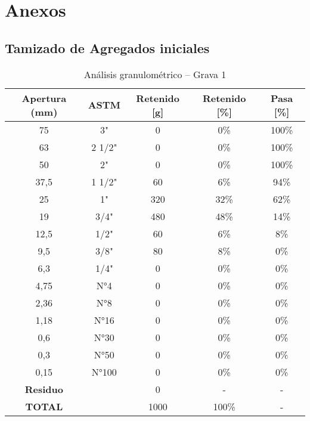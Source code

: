 \section{Anexos}

\subsection{Tamizado de Agregados iniciales}

\begin{table}[H]
\centering
\caption{Análisis granulométrico – Grava 1}
\label{tab:grava1}
\small
\begin{tabular}{|c|c|c|c|c|}
\hline
\textbf{Apertura (mm)} & \textbf{ASTM} & \textbf{Retenido [g]} & \textbf{Retenido [\%]} & \textbf{Pasa [\%]} \\ \hline
75   & 3"      & 0   & 0\%  & 100\% \\ \hline
63   & 2 1/2"  & 0   & 0\%  & 100\% \\ \hline
50   & 2"      & 0   & 0\%  & 100\% \\ \hline
37,5 & 1 1/2"  & 60  & 6\%  & 94\%  \\ \hline
25   & 1"      & 320 & 32\% & 62\%  \\ \hline
19   & 3/4"    & 480 & 48\% & 14\%  \\ \hline
12,5 & 1/2"    & 60  & 6\%  & 8\%   \\ \hline
9,5  & 3/8"    & 80  & 8\%  & 0\%   \\ \hline
6,3  & 1/4"    & 0   & 0\%  & 0\%   \\ \hline
4,75 & N°4     & 0   & 0\%  & 0\%   \\ \hline
2,36 & N°8     & 0   & 0\%  & 0\%   \\ \hline
1,18 & N°16    & 0   & 0\%  & 0\%   \\ \hline
0,6  & N°30    & 0   & 0\%  & 0\%   \\ \hline
0,3  & N°50    & 0   & 0\%  & 0\%   \\ \hline
0,15 & N°100   & 0   & 0\%  & 0\%   \\ \hline
\textbf{Residuo} &     & 0   & -    & -     \\ \hline
\textbf{TOTAL}  &     & 1000& 100\%& -     \\ \hline
\end{tabular}
\end{table}

